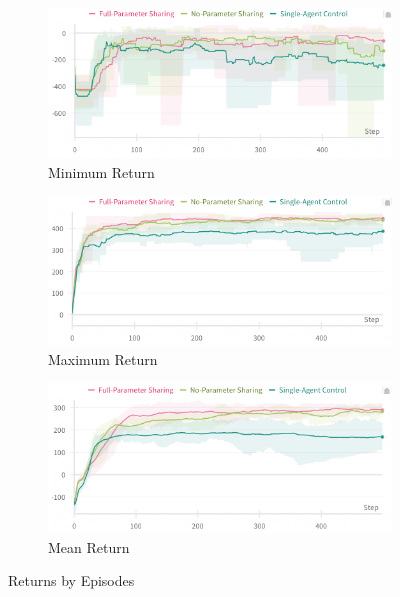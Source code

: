 \documentclass[12pt,letterpaper]{exam}
\begin{document}
\begin{questions}
\begin{figure}[b]
    \centering
    \begin{subfigure}{.48\textwidth}
        \centering
        \includegraphics[width=\linewidth]{ep_return_min.png}
        \caption{Minimum Return}
    \end{subfigure}
    \hfil
    \begin{subfigure}{.48\textwidth}
        \centering
        \includegraphics[width=\linewidth]{ep_return_max.png}
        \caption{Maximum Return}
    \end{subfigure}
    \begin{subfigure}{.65\textwidth}
        \centering
        \includegraphics[width=\linewidth]{ep_return_mean.png}
        \caption{Mean Return}
    \end{subfigure}
    \caption{Returns by Episodes}
    \label{fig:ep_returns}
\end{figure}


\end{questions}
\end{document}
